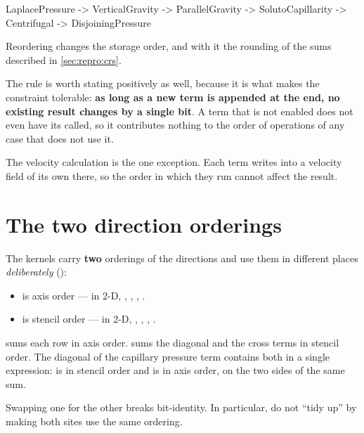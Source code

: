 \begin{plain}
LaplacePressure -> VerticalGravity -> ParallelGravity
                -> SolutoCapillarity -> Centrifugal -> DisjoiningPressure
\end{plain}

\begin{warn}
  Reordering changes the storage order, and with it the rounding of the sums
  described in \cref{sec:repro:crs}.
\end{warn}

The rule is worth stating positively as well, because it is what makes the
constraint tolerable: \textbf{as long as a new term is appended at the end, no
existing result changes by a single bit}. A term that is not enabled does not
even have its  called, so it contributes nothing to the order
of operations of any case that does not use it.

The velocity calculation  is the one exception. Each term
writes into a velocity field of its own there, so the order in which they run
cannot affect the result.

\section{The two direction orderings}
\label{sec:repro:directions}

The kernels carry \textbf{two} orderings of the directions and use them in
different places \emph{deliberately} ():

\begin{itemize}
  \item {} is axis order --- in 2-D, , ,
    , .
  \item {} is stencil order --- in 2-D, ,
    , , .
\end{itemize}

 sums each row in axis order.  sums the
diagonal and the cross terms in stencil order. The diagonal of the capillary
pressure term contains both in a single expression:
 is in stencil order and
 is in axis order, on the two sides of
the same sum.

\begin{warn}
  Swapping one for the other breaks bit-identity. In particular, do not ``tidy
  up'' by making both sites use the same ordering.
\end{warn}


